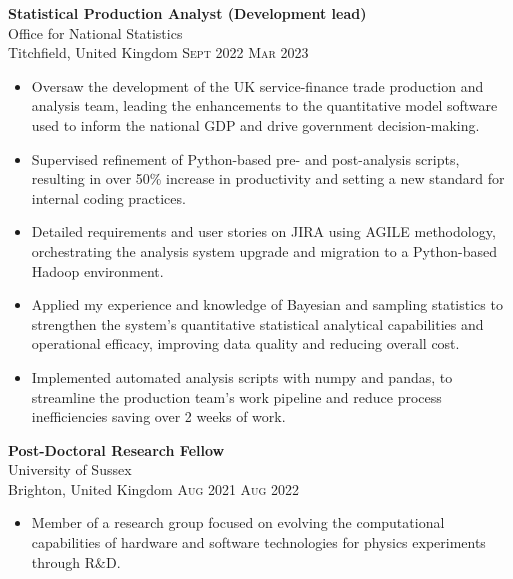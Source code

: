 \documentclass[oneside]{article}
\newcommand{\empitem}[7]{
        {\large \textbf{#1}} \\
        {{\fontseries{medium}\selectfont #2}}\\
        {{\fontseries{light}\selectfont #3}} \hfill
        {\scshape\fontseries{light}\selectfont\footnotesize #4 \textendash{} #5 #6} 
        #7
}
\begin{document}
{\begin{minipage}[t][\dimexpr\textheight-2\fboxrule-2\fboxsep\relax][t]{\dimexpr0.6\textwidth-2\fboxrule-2\fboxsep\relax}
{\begin{itemize}
        \end{itemize}
        }
%
        \empitem {Statistical Production Analyst (Development lead)}
        {Office for National Statistics}
        {Titchfield, United Kingdom}
        {Sept 2022}
        {Mar 2023}
        {}
        {
        \begin{itemize}
            \setlength{\itemsep}{-3pt}
            \item Oversaw the development of the UK service-finance trade production and analysis team, leading the enhancements to the quantitative model software used to inform the national GDP and drive government decision-making.
            \item Supervised refinement of Python-based pre- and post-analysis scripts, resulting in over 50\% increase in productivity and setting a new standard for internal coding practices.
            \item Detailed requirements and user stories on JIRA using AGILE methodology, orchestrating the analysis system upgrade and migration to a Python-based Hadoop environment.
            \item Applied my experience and knowledge of Bayesian and sampling statistics to strengthen the system's quantitative statistical analytical capabilities and operational efficacy, improving data quality and reducing overall cost.
            \item Implemented automated analysis scripts with numpy and pandas, to streamline the production team's work pipeline and reduce process inefficiencies saving over 2 weeks of work.   
        \end{itemize}
        }
%
        \empitem{Post-Doctoral Research Fellow}
        {University of Sussex}
        {Brighton, United Kingdom}
        {Aug 2021}
        {Aug 2022}
        {}
        {
        \begin{itemize}
            \setlength{\itemsep}{-3pt}
            \item Member of a research group focused on evolving the computational capabilities of hardware and software technologies for physics experiments through R$\&$D.


\end{itemize}}
\end{minipage}}
\end{document}
